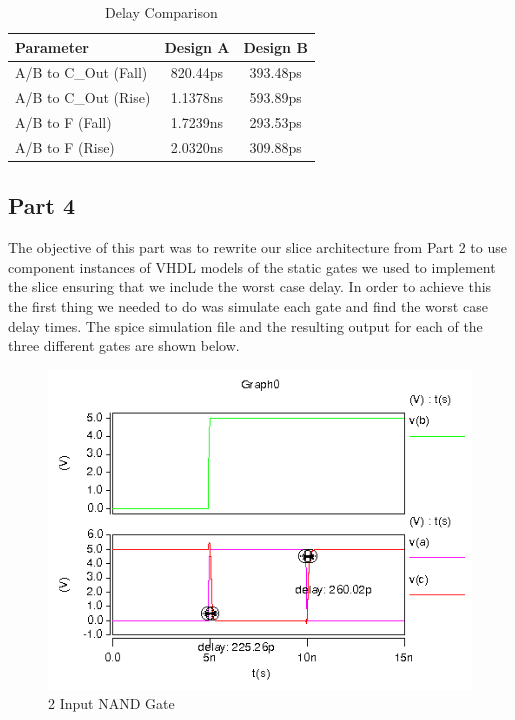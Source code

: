 \documentclass{article}
\begin{document}
\vspace{0.25in}
\begin{table}[H]
    \centering
    \begin{tabular}{lcc}
        \toprule
        \textbf{Parameter} & \textbf{Design A} & \textbf{Design B} \\
        \midrule
        A/B to C\_Out (Fall) & 820.44ps & 393.48ps \\
        A/B to C\_Out (Rise) & 1.1378ns & 593.89ps \\
        A/B to F (Fall)     & 1.7239ns & 293.53ps \\
        A/B to F (Rise)     & 2.0320ns & 309.88ps \\
        \bottomrule
    \end{tabular}
    \caption{Delay Comparison}
\end{table}

\newpage
\subsection*{Part 4}

The objective of this part was to rewrite our slice architecture from Part 2 to
use component instances of VHDL models of the static gates we used to implement
the slice ensuring that we include the worst case delay. In order to achieve this
the first thing we needed to do was simulate each gate and find the worst case delay
times. The spice simulation file and the resulting output for each of the three different
gates are shown below.

\begin{figure}[H]
    \centering
    \includegraphics[width=0.75\linewidth]{../part_4/hspice/nand2_inv.png}
    \caption{2 Input NAND Gate}
\end{figure}
\end{document}
